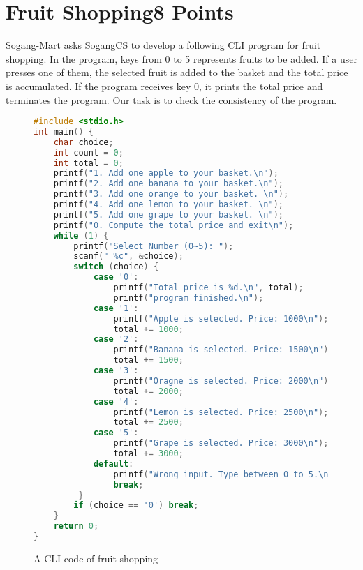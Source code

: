 \clearpage
\section {Fruit Shopping\hfill 8 Points}
Sogang-Mart asks SogangCS to develop a following CLI program for fruit shopping.
In the program, keys from 0 to 5 represents fruits to be added.
If a user presses one of them, the selected fruit is added to the basket and the total price is accumulated. 
If the program receives key 0, it prints the total price and terminates the program.
Our task is to check the consistency of the program.

\begin{figure}[h]
\begin{lstlisting}[language=C]
#include <stdio.h>
int main() {
    char choice;
    int count = 0;
    int total = 0;
    printf("1. Add one apple to your basket.\n");
    printf("2. Add one banana to your basket.\n");
    printf("3. Add one orange to your basket. \n");
    printf("4. Add one lemon to your basket. \n");
    printf("5. Add one grape to your basket. \n");
    printf("0. Compute the total price and exit\n");
    while (1) {
        printf("Select Number (0~5): ");
        scanf(" %c", &choice);
        switch (choice) {
            case '0':
                printf("Total price is %d.\n", total);
                printf("program finished.\n");
            case '1':
                printf("Apple is selected. Price: 1000\n");
                total += 1000;
            case '2':
                printf("Banana is selected. Price: 1500\n");
                total += 1500;
            case '3':
                printf("Oragne is selected. Price: 2000\n");
                total += 2000;
            case '4':
                printf("Lemon is selected. Price: 2500\n");
                total += 2500;
            case '5':
                printf("Grape is selected. Price: 3000\n");
                total += 3000;
            default:
                printf("Wrong input. Type between 0 to 5.\n");
                break;
         }  
        if (choice == '0') break;
    }
    return 0;
}
\end{lstlisting}
\caption{A CLI code of fruit shopping}
\end{figure}
